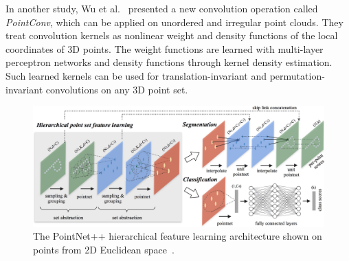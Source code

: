 \vspace{5mm}

\noindent In another study, Wu et al.~\cite{DBLP:journals/corr/abs-1811-07246} presented a new convolution operation called \textit{PointConv}, which can be applied on unordered and irregular point clouds. They treat convolution kernels as nonlinear weight and density functions of the local coordinates of 3D points. The weight functions are learned with multi-layer perceptron networks and density functions through kernel density estimation. Such learned kernels can be used for translation-invariant and permutation-invariant convolutions on any 3D point set. \par
\vspace{5mm}
\begin{figure}[H]
\begin{center}
  \includegraphics[width=\textwidth]{images/related_work/pointnet2.jpg}
  \caption[The PointNet++ hierarchical feature learning architecture~\cite{DBLP:journals/corr/QiYSG17}.]{The PointNet++ hierarchical feature learning architecture shown on points from 2D Euclidean space~\cite{DBLP:journals/corr/QiYSG17}.}
  \label{fig:Pointnet2}
\end{center}
\end{figure}

